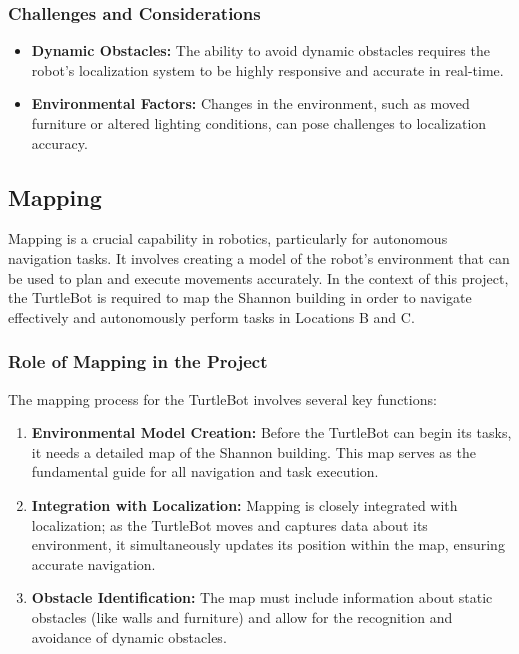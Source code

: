 \documentclass{article}
\begin{document}
	\subsubsection{Challenges and Considerations}
	\begin{itemize}
		\item \textbf{Dynamic Obstacles:} The ability to avoid dynamic obstacles requires the robot's localization system to be highly responsive and accurate in real-time.
		\item \textbf{Environmental Factors:} Changes in the environment, such as moved furniture or altered lighting conditions, can pose challenges to localization accuracy.
	\end{itemize}
	\subsection{Mapping}
	Mapping is a crucial capability in robotics, particularly for autonomous navigation tasks. It involves creating a model of the robot's environment that can be used to plan and execute movements accurately. In the context of this project, the TurtleBot is required to map the Shannon building in order to navigate effectively and autonomously perform tasks in Locations B and C.
	
	\subsubsection{Role of Mapping in the Project}
	The mapping process for the TurtleBot involves several key functions:
	\begin{enumerate}
		\item \textbf{Environmental Model Creation:} Before the TurtleBot can begin its tasks, it needs a detailed map of the Shannon building. This map serves as the fundamental guide for all navigation and task execution.
		\item \textbf{Integration with Localization:} Mapping is closely integrated with localization; as the TurtleBot moves and captures data about its environment, it simultaneously updates its position within the map, ensuring accurate navigation.
		\item \textbf{Obstacle Identification:} The map must include information about static obstacles (like walls and furniture) and allow for the recognition and avoidance of dynamic obstacles.
	\end{enumerate}
	
\end{document}
